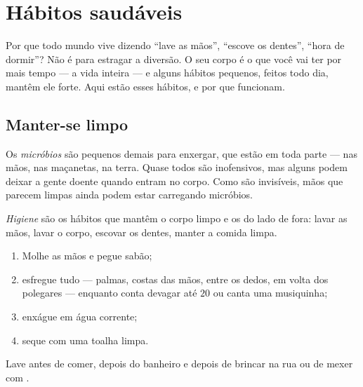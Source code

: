 \chapter{Hábitos saudáveis}\label{ch:g1:healthy-habits}

Por que todo mundo vive dizendo ``lave as mãos'', ``escove os
dentes'', ``hora de dormir''? Não é para estragar a diversão. O seu
corpo é o  que você vai ter por mais tempo --- a vida
inteira --- e alguns hábitos pequenos, feitos todo dia, mantêm ele
forte. Aqui estão esses hábitos, e por que funcionam.

\section{Manter-se limpo}

\begin{definition}[Micróbios]\label{def:g1:healthy-habits:germs}
Os \emph{micróbios} são  pequenos demais
para enxergar, que estão em toda parte --- nas mãos, nas maçanetas,
na terra. Quase todos são inofensivos, mas alguns podem deixar a
gente doente quando entram no corpo. Como são invisíveis, mãos que
parecem limpas ainda podem estar carregando micróbios.
\end{definition}

\begin{definition}[Higiene]\label{def:g1:healthy-habits:hygiene}
\emph{Higiene} são os hábitos que mantêm o corpo
limpo e os  do lado de fora: lavar as mãos, lavar o corpo,
escovar os dentes, manter a comida limpa.
\end{definition}

\begin{method}\label{met:g1:healthy-habits:hands}
\begin{enumerate}
  \item Molhe as mãos e pegue sabão;
  \item esfregue tudo --- palmas, costas das mãos, entre os dedos,
        em volta dos polegares --- enquanto conta devagar até $20$
        ou canta uma musiquinha;
  \item enxágue em água corrente;
  \item seque com uma toalha limpa.
\end{enumerate}
Lave antes de comer, depois do banheiro e depois de brincar na rua
ou de mexer com .
\end{method}

